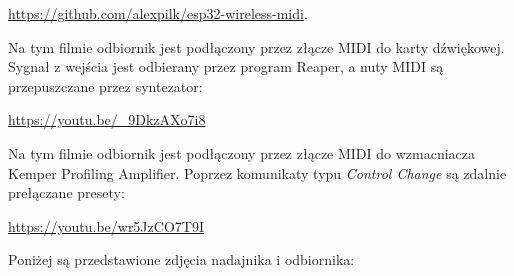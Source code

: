 \documentclass[eng,printmode]{mgr}
\begin{document}
\href{https://github.com/alexpilk/esp32-wireless-midi}{https://github.com/alexpilk/esp32-wireless-midi}.
\bigbreak

Na tym filmie odbiornik jest podłączony przez złącze MIDI do karty dźwiękowej. Sygnał z wejścia jest odbierany przez program Reaper, a nuty MIDI są przepuszczane przez syntezator:

\href{https://youtu.be/\_9DkzAXo7i8}{https://youtu.be/\_9DkzAXo7i8}
\bigbreak

Na tym filmie odbiornik jest podłączony przez złącze MIDI do wzmacniacza Kemper Profiling Amplifier. Poprzez komunikaty typu \textit{Control Change} są zdalnie prełączane presety:

\href{https://youtu.be/wr5JzCO7T9I}{https://youtu.be/wr5JzCO7T9I}
\bigbreak

Poniżej są przedstawione zdjęcia nadajnika i odbiornika:
\end{document}

